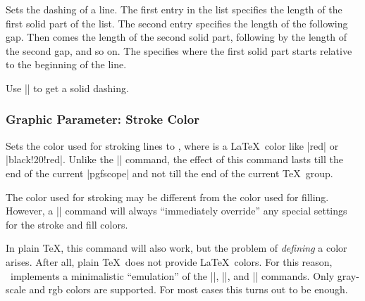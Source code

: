 \begin{command}{\pgfsetdash{}}
  Sets the dashing of a line. The first entry in the list specifies
  the length of the first solid part of the list. The second entry
  specifies the length of the following gap. Then comes the length of
  the second solid part, following by the length of the second gap,
  and so on. The  specifies where the first solid part
  starts relative to the beginning of the line.

\begin{codeexample}[]
\begin{pgfpicture}
  \pgfsetdash{{0.5cm}{0.5cm}{0.1cm}{0.2cm}}{0cm}
  \pgfpathmoveto{\pgfpoint{0mm}{0mm}}
  \pgfpathlineto{\pgfpoint{2cm}{0mm}}
  \pgfsetdash{{0.5cm}{0.5cm}{0.1cm}{0.2cm}}{0.1cm}
  \pgfpathmoveto{\pgfpoint{0mm}{1mm}}
  \pgfpathlineto{\pgfpoint{2cm}{1mm}}
  \pgfsetdash{{0.5cm}{0.5cm}{0.1cm}{0.2cm}}{0.2cm}
  \pgfpathmoveto{\pgfpoint{0mm}{2mm}}
  \pgfpathlineto{\pgfpoint{2cm}{2mm}}
\end{pgfpicture}
\end{codeexample}

  Use |\pgfsetdash{}{0pt}| to get a solid dashing.
\end{command}

\subsubsection{Graphic Parameter: Stroke Color}

\begin{command}{\pgfsetstrokecolor{}}
  Sets the color used for stroking lines to , where
   is a \LaTeX\ color like |red| or |black!20!red|. Unlike
  the |\color| command, the effect of this command lasts till the end
  of the current |{pgfscope}| and not till the end of the current
  \TeX\ group.

  The color used for stroking may be different from the color used for
  filling. However, a |\color| command will always ``immediately
  override'' any special settings for the stroke and fill colors.

  In plain \TeX, this command will also work, but the problem of
  \emph{defining} a color arises. After all, plain \TeX\ does not
  provide \LaTeX\ colors. For this reason, \pgfname\ implements a
  minimalistic ``emulation'' of the |\definecolor|, ||, and
  |\color| commands. Only gray-scale and rgb colors are supported. For
  most cases this turns out to be enough.

\begin{codeexample}[]
\begin{pgfpicture}
  \pgfsetlinewidth{1pt}
  \color{red}
  \pgfpathcircle{\pgfpoint{0cm}{0cm}}{3mm} 
  \pgfpathcircle{\pgfpoint{1cm}{0cm}}{3mm} 
  \color{red}
  \pgfpathcircle{\pgfpoint{2cm}{0cm}}{3mm} 
\end{pgfpicture}
\end{codeexample}
\end{command}

